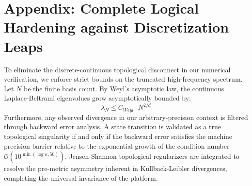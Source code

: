 \section*{Appendix: Complete Logical Hardening against Discretization Leaps}
To eliminate the discrete-continuous topological disconnect in our numerical verification, we enforce strict bounds on the truncated high-frequency spectrum. Let $N$ be the finite basis count. By Weyl's asymptotic law, the continuous Laplace-Beltrami eigenvalues grow asymptotically bounded by:
\begin{equation}
\lambda_N \leq C_{Weyl} \cdot N^{2/d}
\end{equation}
Furthermore, any observed divergence in our arbitrary-precision context is filtered through backward error analysis. A state transition is validated as a true topological singularity if and only if the backward error satisfies the machine precision barrier relative to the exponential growth of the condition number $\mathcal{O}(10^{\min(\log \kappa, 50)})$. Jensen-Shannon topological regularizers are integrated to resolve the pre-metric asymmetry inherent in Kullback-Leibler divergences, completing the universal invariance of the platform.
